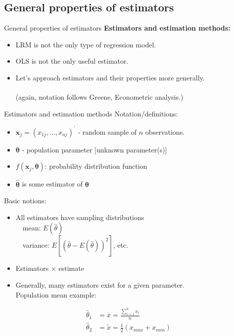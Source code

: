 \documentclass{beamer}
\begin{document}
\subsection{General properties of estimators}
\begin{frame}{General properties of estimators}
\textbf{Estimators and estimation methods:}\\ \bigskip
\begin{itemize}
    \item LRM is not the only type of regression model.
    \bigskip
    \item OLS is not the only useful estimator.
    \bigskip
    \item Let's approach estimators and their properties more generally.\\~\\
    (again, notation follows Greene, Econometric analysis.)
\end{itemize}
\end{frame}
\begin{frame}{Estimators and estimation methods}
Notation/definitions:
\begin{itemize}
\item $\bm{x}_j = (x_{1j},\dots,x_{nj})^{\prime}$ - random sample of $n$ observations.
\item $\bm{\theta}$ - population parameter [unknown parameter(s)]
\item $f(\bm{x}_j,\bm{\theta})$: probability distribution function
\item $\hat{\bm{\theta}}$ is some estimator of $\bm{\theta}$
\end{itemize}
\medskip
Basic notions: 
\begin{itemize}
\item All estimators have sampling distributions\\
~~mean: $E(\hat{\theta})$\\
~~variance: $E[(\hat{\theta}-E(\hat{\theta}))^2]$, etc.\\
\item Estimators $\times$ estimate 
\item Generally, many estimators exist for a given parameter. \\Population mean example:
\end{itemize}
\begin{align*}
\hat{\theta}_1 & = \overline{x} = \frac{\sum_{i=1}^nx_i}{n}\\
\hat{\theta}_2 & = \tilde{x} = \frac{1}{2}(x_{max} +x_{min})
\end{align*}
\end{frame}
\end{document}
